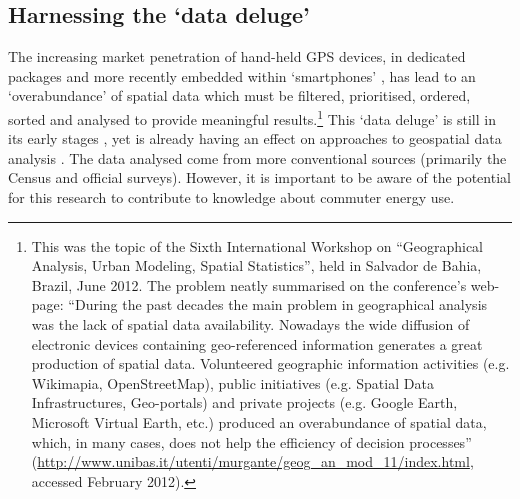 % 

\subsection{Harnessing the `data deluge'}
The increasing market penetration of hand-held GPS devices, in dedicated
packages \citep{Oliver2010} and more recently embedded within `smartphones'
\citep{Gong2011}, has lead to an `overabundance' of spatial data which must be
filtered, prioritised, ordered, sorted and analysed to provide meaningful
results.\footnote{%
This was the topic of
the Sixth International Workshop on ``Geographical Analysis,
Urban Modeling, Spatial Statistics'', held in Salvador de Bahia, Brazil,
June 2012. The problem neatly summarised on the conference's web-page:
``During the past decades the main problem in geographical
analysis was the lack of spatial data availability. Nowadays the wide diffusion
of electronic devices containing geo-referenced information generates a great
production of spatial data. Volunteered geographic information activities (e.g.
Wikimapia, OpenStreetMap), public initiatives (e.g. Spatial Data
Infrastructures, Geo-portals) and private projects (e.g. Google Earth, Microsoft
Virtual Earth, etc.) produced an overabundance of spatial data, which, in many
cases, does not help the efficiency of decision
processes''
(\url{http://www.unibas.it/utenti/murgante/geog_an_mod_11/index.html}, accessed
February 2012).
}
This `data deluge' is still in its early stages \citep{Bell2009}, yet is
already having an effect on approaches to geospatial data analysis
\citep{Jiang2011}. The data analysed come from more
conventional sources (primarily the Census and official surveys). However, it is
important to be aware of the potential for this research to contribute to
knowledge about commuter energy use.


